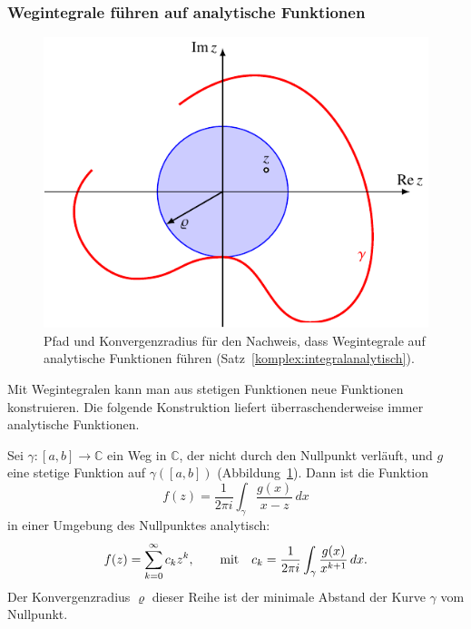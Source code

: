 %
%
\subsubsection{Wegintegrale führen auf analytische Funktionen}
\begin{figure}
\centering
\includegraphics{chapters/080-funktionentheorie/images/integralanalytisch.pdf}
\caption{Pfad und Konvergenzradius für den Nachweis, dass Wegintegrale
auf analytische Funktionen führen (Satz~\ref{komplex:integralanalytisch}).
\label{komplex:integralanalytischpfad}}
\end{figure}
Mit Wegintegralen kann man aus stetigen Funktionen neue Funktionen
konstruieren.
Die folgende Konstruktion liefert überraschenderweise immer
analytische Funktionen.
\begin{satz}
\label{komplex:integralanalytisch}
Sei $\gamma\colon [a,b]\to\mathbb C$ ein Weg in $\mathbb C$, der nicht
durch den Nullpunkt verläuft, und $g$ eine stetige Funktion
auf $\gamma([a,b])$ (Abbildung~\ref{komplex:integralanalytischpfad}).
Dann ist die Funktion
\[
f(z) = \frac1{2\pi i}\int_\gamma \frac{g(x)}{x-z}\,dx
\]
in einer Umgebung des Nullpunktes analytisch:
\[
f(z) = \sum_{k=0}^\infty c_k z^k,\qquad
\text{mit\quad}
c_k=\frac1{2\pi i}\int_\gamma \frac{g(x)}{x^{k+1}}\,dx.
\]
Der Konvergenzradius $\varrho$ dieser Reihe ist der minimale Abstand der
Kurve $\gamma$ vom Nullpunkt.
\end{satz}


